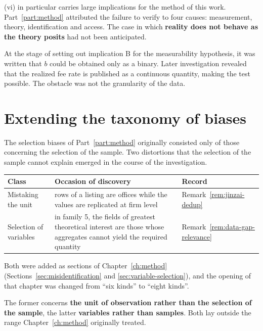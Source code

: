 (vi) in particular carries large implications for the method of this work. Part~\ref{part:method}
attributed the failure to verify to four causes: measurement, theory, identification and access.
The case in which \textbf{reality does not behave as the theory posits} had not been anticipated.

At the stage of setting out implication B for the measurability hypothesis, it was written that
$b$ could be obtained only as a binary. Later investigation revealed that the realized fee rate is
published as a continuous quantity, making the test possible. The obstacle was not the granularity
of the data.

\section{Extending the taxonomy of biases}

The selection biases of Part~\ref{part:method} originally consisted only of those concerning the
selection of the sample. Two distortions that the selection of the sample cannot explain emerged
in the course of the investigation.

\begin{center}
\begin{tabularx}{\textwidth}{@{}lXl@{}}
\toprule
Class & Occasion of discovery & Record \\
\midrule
Mistaking the unit & rows of a listing are offices while the values are replicated at firm level & Remark~\ref{rem:jinzai-dedup} \\
Selection of variables & in family 5, the fields of greatest theoretical interest are those whose aggregates cannot yield the required quantity & Remark~\ref{rem:data-gap-relevance} \\
\bottomrule
\end{tabularx}
\label{tab:bias-extension}
\end{center}

Both were added as sections of Chapter~\ref{ch:method}
(Sections~\ref{sec:misidentification} and \ref{sec:variable-selection}), and the opening of that
chapter was changed from ``six kinds'' to ``eight kinds''.

The former concerns \textbf{the unit of observation rather than the selection of the sample}, the
latter \textbf{variables rather than samples}. Both lay outside the range Chapter~\ref{ch:method}
originally treated.

